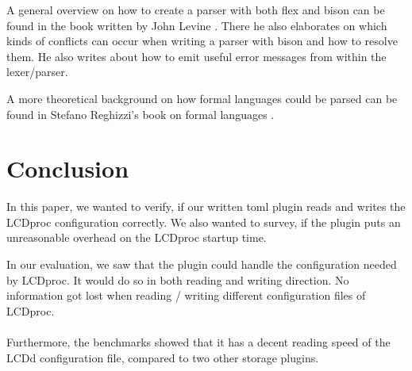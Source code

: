 \documentclass[draft,final]{vutinfth} %
\begin{document}
A general overview on how to create a parser with both flex and bison can be found in the book written by John Levine \cite{levineflexbison}.
There he also elaborates on which kinds of conflicts can occur when writing a parser with bison and how to resolve them.
He also writes about how to emit useful error messages from within the lexer/parser.

A more theoretical background on how formal languages could be parsed can be found in Stefano Reghizzi's book on formal languages \cite{reghizziformallanguages}.


\chapter{Conclusion}
In this paper, we wanted to verify, if our written \acrshort{toml} plugin reads and writes the LCDproc configuration correctly.
We also wanted to survey, if the plugin puts an unreasonable overhead on the LCDproc startup time.

In our evaluation, we saw that the plugin could handle the configuration needed by LCDproc.
It would do so in both reading and writing direction.
No information got lost when reading / writing different configuration files of LCDproc.
\\\\
Furthermore, the benchmarks showed that it has a decent reading speed of the LCDd configuration file, compared to two other storage plugins.

\backmatter

\listoffigures

\listoftables


\printglossary[type=\acronymtype]

{}

\end{document}
